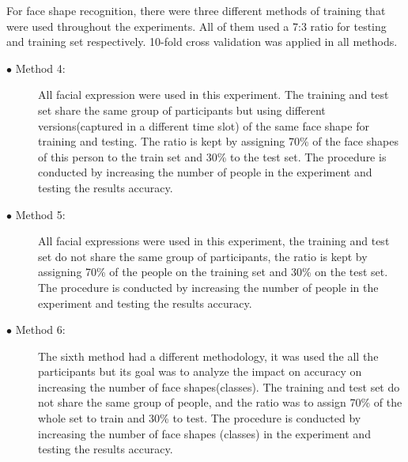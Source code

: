 \documentclass[]{article}
\begin{document}
For face shape recognition, there were three different methods of training that
were used throughout the experiments. All of them used a 7:3 ratio for testing 
and training set respectively. 10-fold cross validation was applied in all
methods.

\begin{description}
\item[$\bullet$ Method 4:] All facial expression were used in this experiment.
The training and test set share the same group of participants but using
different  versions(captured in a different time slot) of the same face shape
for training and testing. The ratio is kept by assigning 70\% of the face shapes
of this person to the train set and 30\% to the test set. The procedure is conducted
by increasing the number of people in the experiment and testing the results
accuracy.
\item[$\bullet$ Method 5:] All facial expressions were used in this experiment,
the training and test set do not  share the same group of participants, the
ratio is kept by assigning 70\% of the people on the training set and 30\% on the
test set. The procedure is conducted by increasing the number of people in the
experiment and testing the results accuracy.
\item[$\bullet$ Method 6:] The sixth method had a different methodology, it was
used the all the participants but its goal was to analyze the impact on accuracy
on increasing the number of face shapes(classes).  The training and test set do
not share the same group of people, and the ratio was to assign 70\% of the whole set to
train and 30\% to test. The procedure is conducted by increasing the number of
face shapes (classes) in the experiment and testing the results accuracy.
\end{description}
\end{document}
